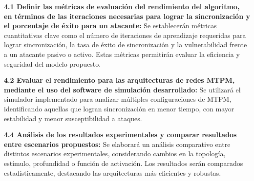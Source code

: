 \textbf{4.1 Definir las métricas de evaluación del rendimiento del algoritmo, en términos de las iteraciones necesarias para lograr la sincronización y el porcentaje de éxito para un atacante:}  
Se establecerán métricas cuantitativas clave como el número de iteraciones de aprendizaje requeridas para lograr sincronización, la tasa de éxito de sincronización y la vulnerabilidad frente a un atacante pasivo o activo. Estas métricas permitirán evaluar la eficiencia y seguridad del modelo propuesto.

\textbf{4.2 Evaluar el rendimiento para las arquitecturas de redes MTPM, mediante el uso del software de simulación desarrollado:}  
Se utilizará el simulador implementado para analizar múltiples configuraciones de MTPM, identificando aquellas que logran sincronización en menor tiempo, con mayor estabilidad y menor susceptibilidad a ataques.

\textbf{4.4 Análisis de los resultados experimentales y comparar resultados entre escenarios propuestos:}  
Se elaborará un análisis comparativo entre distintos escenarios experimentales, considerando cambios en la topología, estímulo, profundidad o función de activación. Los resultados serán comparados estadísticamente, destacando las arquitecturas más eficientes y robustas.
